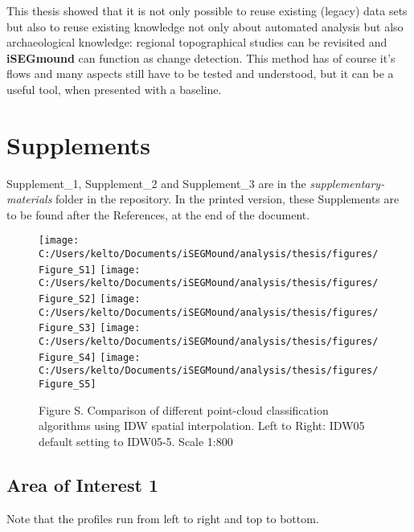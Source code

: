 \documentclass[
  12pt,
]{article}
\begin{document}
\newline
This thesis showed that it is not only possible to reuse existing (legacy) data sets but also to reuse existing knowledge not only about automated analysis but also archaeological knowledge: regional topographical studies can be revisited and \textbf{iSEGmound} can function as change detection.
This method has of course it's flows and many aspects still have to be tested and understood, but it can be a useful tool, when presented with a baseline.

\newpage

\hypertarget{supplements}{%
\section{Supplements}\label{supplements}}

Supplement\_1, Supplement\_2 and Supplement\_3 are in the \emph{supplementary-materials} folder in the repository. In the printed version, these Supplements are to be found after the References, at the end of the document.

\begin{figure}
\texttt{[image: C:/Users/kelto/Documents/iSEGMound/analysis/thesis/figures/Figure\_S1]} \texttt{[image: C:/Users/kelto/Documents/iSEGMound/analysis/thesis/figures/Figure\_S2]} \texttt{[image: C:/Users/kelto/Documents/iSEGMound/analysis/thesis/figures/Figure\_S3]} \texttt{[image: C:/Users/kelto/Documents/iSEGMound/analysis/thesis/figures/Figure\_S4]} \texttt{[image: C:/Users/kelto/Documents/iSEGMound/analysis/thesis/figures/Figure\_S5]} \caption{Figure S. Comparison of different point-cloud classification algorithms using IDW spatial interpolation. Left to Right: IDW05 default setting to IDW05-5. Scale 1:800}\label{fig:FigureS}
\end{figure}

\newpage

\hypertarget{area-of-interest-1}{%
\subsection{Area of Interest 1}\label{area-of-interest-1}}

Note that the profiles run from left to right and top to bottom.
\end{document}
